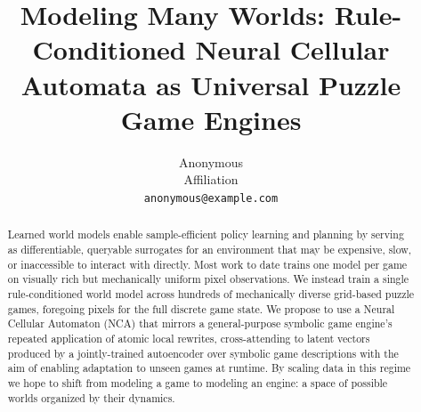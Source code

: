 \documentclass{article}
\title{Modeling Many Worlds: Rule-Conditioned Neural Cellular Automata as Universal Puzzle Game Engines}
\author{%
  Anonymous \\
  Affiliation \\
  \texttt{anonymous@example.com} \\
}
\begin{document}
\maketitle

\begin{abstract}
Learned world models enable sample-efficient policy learning and planning by serving as differentiable, queryable surrogates for an environment that may be expensive, slow, or inaccessible to interact with directly. Most work to date trains one model per game on visually rich but mechanically uniform pixel observations. We instead train a single rule-conditioned world model across hundreds of mechanically diverse grid-based puzzle games, foregoing pixels for the full discrete game state. We propose to use a Neural Cellular Automaton (NCA) that mirrors a general-purpose symbolic game engine's repeated application of atomic local rewrites, cross-attending to latent vectors produced by a jointly-trained autoencoder over symbolic game descriptions with the aim of enabling adaptation to unseen games at runtime. By scaling data in this regime we hope to shift from modeling a game to modeling an engine: a space of possible worlds organized by their dynamics.


\end{abstract}












\appendix



\end{document}
